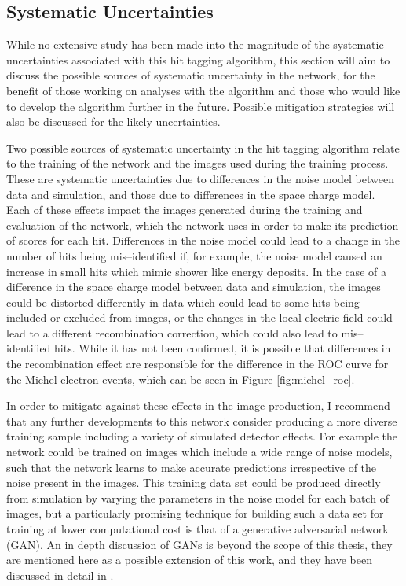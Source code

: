 \subsection{Systematic Uncertainties} \label{hittag_syst}

While no extensive study has been made into the magnitude of the systematic
uncertainties associated with this hit tagging algorithm, this section will aim
to discuss the possible sources of systematic uncertainty in the network, for 
the benefit of those working on analyses with the algorithm and those who 
would like to develop the algorithm further in the future. Possible mitigation 
strategies will also be discussed for the likely uncertainties.

Two possible sources of systematic uncertainty in the hit tagging algorithm 
relate to the training of the network and the images used during the training
process. These are systematic uncertainties due to differences in the noise
model between data and simulation, and those due to differences in the space
charge model. Each of these effects impact the images generated during the
training and evaluation of the network, which the network uses in order to make
its prediction of scores for each hit. Differences in the noise model could lead
to a change in the number of hits being mis--identified if, for example, the 
noise model caused an increase in small hits which mimic shower like energy 
deposits. In the case of a difference in the space charge model between data 
and simulation, the images could be distorted differently in data which could 
lead to some hits being included or excluded from images, or the changes in 
the local electric field could lead to a different recombination correction, 
which could also lead to mis--identified hits. While it has not been confirmed,
it is possible that differences in the recombination effect are responsible for
the difference in the ROC curve for the Michel electron events, which can be
seen in Figure \ref{fig:michel_roc}.

In order to mitigate against these effects in the image production, I
recommend that any further developments to this network consider producing
a more diverse training sample including a variety of simulated detector
effects. For example the network could be trained on images which include a wide
range of noise models, such that the network learns to make accurate predictions
irrespective of the noise present in the images. This training data set could be
produced directly from simulation by varying the parameters in the noise model
for each batch of images, but a particularly promising technique for building 
such a data set for training at lower computational cost is that of a generative
adversarial network (GAN). An in depth discussion of GANs is beyond the scope 
of this thesis, they are mentioned here as a possible extension of this work,
and they have been discussed in detail in \cite{10.5555/2969033.2969125}.

